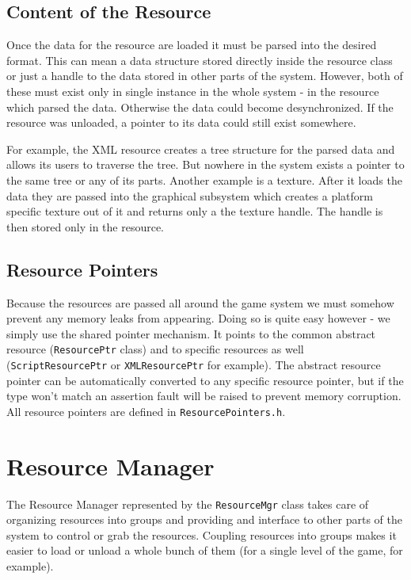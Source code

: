 \subsection{Content of the Resource}
Once the data for the resource are loaded it must be parsed into the desired format. This can mean a data structure stored directly inside the resource class or just a handle to the data stored in other parts of the system. However, both of these must exist only in single instance in the whole system - in the resource which parsed the data. Otherwise the data could become desynchronized. If the resource was unloaded, a pointer to its data could still exist somewhere. 

For example, the XML resource creates a tree structure for the parsed data and allows its users to traverse the tree. But nowhere in the system exists a pointer to the same tree or any of its parts. Another example is a texture. After it loads the data they are passed into the graphical subsystem which creates a platform specific texture out of it and returns only a the texture handle. The handle is then stored only in the resource.

\subsection{Resource Pointers}
Because the resources are passed all around the game system we must somehow prevent any memory leaks from appearing. Doing so is quite easy however - we simply use the shared pointer mechanism. It points to the common abstract resource (\verb'ResourcePtr' class) and to specific resources as well (\verb'ScriptResourcePtr' or \verb'XMLResourcePtr' for example). The abstract resource pointer can be automatically converted to any specific resource pointer, but if the type won't match an assertion fault will be raised to prevent memory corruption. All resource pointers are defined in \verb'ResourcePointers.h'.


\section{Resource Manager}
The Resource Manager represented by the \verb'ResourceMgr' class takes care of organizing resources into groups and providing and interface to other parts of the system to control or grab the resources. Coupling resources into groups makes it easier to load or unload a whole bunch of them (for a single level of the game, for example).

